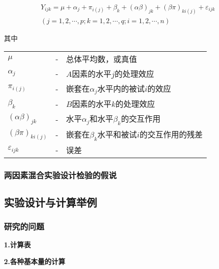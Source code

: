 \begin{definition}[两因素混合实验设计模型]

\begin{align*}
    Y_{ijk} = \mu + \alpha _j + \pi _{i \left( j \right)} + \beta _k + \left( \alpha \beta \right) _{jk} +  \left( \beta \pi \right) _{ki \left( j \right)} + \varepsilon _{ijk}\\
    \left( j=1,2,\cdots ,p; k=1,2,\cdots,q; i=1,2,\cdots,n \right)
\end{align*}

其中

\begin{tabular}{lcl}
    $\mu$                                              & - & 总体平均数，或真值\\
    $\alpha _j$                                        & - & $A$因素的水平$j$的处理效应\\
    $\pi _{i \left( j \right)}$                        & - & 嵌套在$\alpha _j$水平内的被试$i$的效应\\
    $\beta _k$                                         & - & $B$因素的水平$k$的处理效应\\
    $\left( \alpha \beta \right) _{jk}$                & - & 水平$\alpha _j$和水平$\beta _k$的交互作用\\
    $\left( \beta \pi \right) _{ki \left( j \right) }$ & - & 嵌套在$\beta _k$水平和被试$i$的交互作用的残差\\
    $\varepsilon _{ijk}$                               & - & 误差\\
\end{tabular}

\end{definition}

\subsubsection{两因素混合实验设计检验的假说}

\subsection{实验设计与计算举例}
\subsubsection{研究的问题}

\textbf{1.计算表}

\textbf{2.各种基本量的计算}

